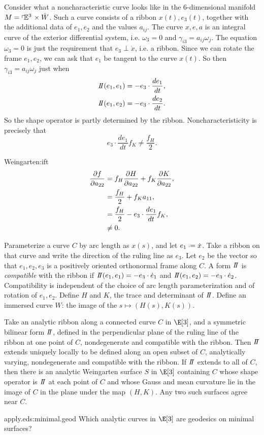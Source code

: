 Consider what a noncharacteristic curve looks like in the \(6\)-dimensional manifold \(M=\left\ulcorner\!\mathbb{E}^{3}\right. \times \hat{W}\).
Such a curve consists of a ribbon \(x(t),e_3(t)\), together with the additional data of \(e_1,e_2\) and the values \(a_{ij}\).
The curve \(x,e,a\) is an integral curve of the exterior differential system, i.e. \(\omega_3=0\) and \(\gamma_{i3}=a_{ij}\omega_j\).
The equation \(\omega_3=0\) is just the requirement that \(e_3 \perp \dot{x}\), i.e. a ribbon.
Since we can rotate the frame \(e_1,e_2\), we can ask that \(e_1\) be tangent to the curve \(x(t)\).
So then \(\gamma_{i3}=a_{ij}\omega_j\) just when
\begin{align*}
\shapeOp(e_1,e_1)&=-e_3\cdot \frac{de_1}{dt},\\
\shapeOp(e_1,e_2)&=-e_3\cdot \frac{de_2}{dt}.
\end{align*}
So the shape operator is partly determined by the ribbon.
Noncharacteristicity is precisely that 
\[
e_3\cdot \frac{de_1}{dt} f_K \ne \frac{f_H}{2}.
\]
\begin{answer}{Weingarten:ift}
\begin{align*}
\pderiv{f}{a_{22}}
&=
f_H\pderiv{H}{a_{22}}+f_K\pderiv{K}{a_{22}},
\\
&=
\frac{f_H}{2}+f_Ka_{11},
\\
&=
\frac{f_H}{2}-e_3\cdot \frac{de_1}{dt} f_K,
\\
&\ne0.
\end{align*}
\end{answer}

Parameterize a curve \(C\) by arc length as \(x(s)\), and let \(e_1\defeq \dot{x}\).
Take a ribbon on that curve and write the direction of the ruling line as \(e_3\).
Let \(e_2\) be the vector so that \(e_1,e_2,e_3\) is a positively oriented orthonormal frame along \(C\).
A form \(\shapeOp\) is \emph{compatible} with the ribbon if \(\shapeOp(e_1,e_1)=-e_3\cdot \dot{e}_1\) and \(\shapeOp(e_1,e_2)=-e_3 \cdot \dot{e}_2\).
Compatibility is independent of the choice of arc length parameterization and of rotation of \(e_1,e_2\).
Define \(H\) and \(K\), the trace and determinant of \(\shapeOp\).
Define an immersed curve \(W\): the image of the \(s\mapsto(H(s),K(s))\). 

\begin{theorem}
Take an  analytic ribbon along a connected curve \(C\) in \(\E[3]\), and a symmetric bilinear form \(\shapeOp\), defined in the perpendicular plane of the ruling line of the ribbon at one point of \(C\), nondegenerate and compatible with the ribbon.
Then \(\shapeOp\) extends uniquely locally to be defined along an open subset of \(C\), analytically varying, nondegenerate and compatible with the ribbon.
If \(\shapeOp\) extends to all of \(C\), then there is an analytic Weingarten surface \(S\) in \(\E[3]\) containing \(C\) whose shape operator is \(\shapeOp\) at each point of \(C\) and whose Gauss and mean curvature lie in the image of \(C\) in the plane under the map \((H,K)\).
Any two such surfaces agree near \(C\).
\end{theorem}

\begin{problem}{apply.eds:minimal.geod}
Which analytic curves in \(\E[3]\) are geodesics on minimal surfaces?
\end{problem}

